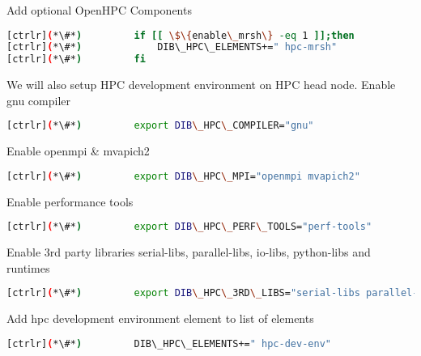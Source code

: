 Add optional OpenHPC Components


\begin{lstlisting}[language=bash,keywords={}]
[ctrlr](*\#*)         if [[ \$\{enable\_mrsh\} -eq 1 ]];then
[ctrlr](*\#*)             DIB\_HPC\_ELEMENTS+=" hpc-mrsh"
[ctrlr](*\#*)         fi
\end{lstlisting} 

We will also setup HPC development environment on HPC head node. 
Enable gnu compiler


\begin{lstlisting}[language=bash,keywords={}]
[ctrlr](*\#*)         export DIB\_HPC\_COMPILER="gnu"
\end{lstlisting} 

Enable openmpi \& mvapich2


\begin{lstlisting}[language=bash,keywords={}]
[ctrlr](*\#*)         export DIB\_HPC\_MPI="openmpi mvapich2"
\end{lstlisting} 

Enable performance tools


\begin{lstlisting}[language=bash,keywords={}]
[ctrlr](*\#*)         export DIB\_HPC\_PERF\_TOOLS="perf-tools"
\end{lstlisting} 

Enable 3rd party libraries serial-libs, parallel-libs, io-libs, python-libs and runtimes


\begin{lstlisting}[language=bash,keywords={}]
[ctrlr](*\#*)         export DIB\_HPC\_3RD\_LIBS="serial-libs parallel-libs io-libs python-libs runtimes"
\end{lstlisting} 

Add hpc development environment element to list of elements


\begin{lstlisting}[language=bash,keywords={}]
[ctrlr](*\#*)         DIB\_HPC\_ELEMENTS+=" hpc-dev-env"
\end{lstlisting} 

